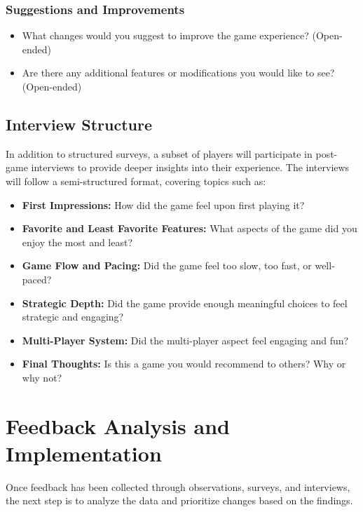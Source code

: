 \documentclass{article}
\begin{document}
\subsubsection{Suggestions and Improvements}
\begin{itemize}
    \item What changes would you suggest to improve the game experience? (Open-ended)
    \item Are there any additional features or modifications you would like to see? (Open-ended)
\end{itemize}

\subsection{Interview Structure}
In addition to structured surveys, a subset of players will participate in post-game interviews to provide deeper insights into their experience. The interviews will follow a semi-structured format, covering topics such as:

\begin{itemize}
    \item \textbf{First Impressions:} How did the game feel upon first playing it?
    \item \textbf{Favorite and Least Favorite Features:} What aspects of the game did you enjoy the most and least?
    \item \textbf{Game Flow and Pacing:} Did the game feel too slow, too fast, or well-paced?
    \item \textbf{Strategic Depth:} Did the game provide enough meaningful choices to feel strategic and engaging?
    \item \textbf{Multi-Player System:} Did the multi-player aspect feel engaging and fun?
    \item \textbf{Final Thoughts:} Is this a game you would recommend to others? Why or why not?
\end{itemize}

\newpage

\section{Feedback Analysis and Implementation}
Once feedback has been collected through observations, surveys, and interviews, the next step is to analyze the data and prioritize changes based on the findings. 
\end{document}
